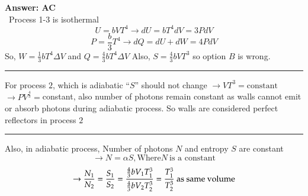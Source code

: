 \documentclass[11pt,a4paper]{scrartcl}
\begin{document}
\begin{solution}
{\Large{\textbf{Answer: AC}}}\\
\
Process 1-3 is isothermal\
\
$$U=bVT^4 \rightarrow dU=bT^4dV=3PdV$$
$$P=\frac{b}{3}T^4 \rightarrow dQ=dU+dW=4PdV$$
So, $W=\frac{1}{3}bT^4\Delta V$ and $Q=\frac{4}{3}bT^4\Delta V$
Also, $S=\frac{4}{3}bVT^3$ so option $B$ is wrong.\
\rule{\textwidth}{0.4pt}
For process $2$, which is adiabatic
``$S$'' should not change $\rightarrow VT^3 = \text{constant}$
$\rightarrow PV^{\frac{4}{3}}=$constant, also number of photons remain constant as walls cannot emit or absorb photons during adiabatic process. So walls are considered perfect reflectors in process $2$

\rule{\textwidth}{0.4pt}
Also, in adiabatic process, Number of photons $N$ and entropy $S$ are constant
$$\rightarrow N=\alpha S, \text{Where} N \ \text{is a constant}$$
$$\rightarrow \frac{N_1}{N_2}=\frac{S_1}{S_2}=\frac{\frac{4}{3}b V_1 T^3_1 }{{4 \over 3}bV_2 T_2^3}=\frac{T_1^3}{T_2^3}\ \text{as same volume}$$

\end{solution}
\vspace{10mm}%
\end{document}
